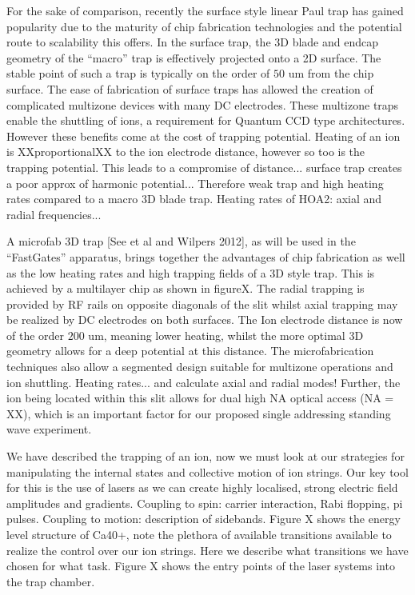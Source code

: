 For the sake of comparison, recently the surface style linear Paul
trap has gained popularity due to the maturity of chip fabrication
technologies and the potential route to scalability this offers. In
the surface trap, the 3D blade and endcap geometry of the ``macro''
trap is effectively projected onto a 2D surface. The stable point of
such a trap is typically on the order of $50$ um from the chip
surface. The ease of fabrication of surface traps has allowed the
creation of complicated multizone devices with many DC electrodes.
These multizone traps enable the shuttling of ions, a requirement for
Quantum CCD type architectures. However these benefits come at the
cost of trapping potential. Heating of an ion is XXproportionalXX to
the ion electrode distance, however so too is the trapping
potential. This leads to a compromise of distance... surface trap
creates a poor approx of harmonic potential... Therefore weak trap and
high heating rates compared to a macro 3D blade trap. Heating rates of
HOA2: axial and radial frequencies...

A microfab 3D trap [See et al and Wilpers 2012], as will be used in the ``FastGates''
apparatus, brings together the advantages of chip fabrication as well
as the low heating rates and high trapping fields of a 3D style
trap. This is achieved by a multilayer chip as shown in figureX. The
radial trapping is provided by RF rails on opposite diagonals of the
slit whilst axial trapping may be realized by DC electrodes on both
surfaces. The Ion electrode distance is now of the order $200$ um,
meaning lower heating, whilst the more optimal 3D geometry allows for
a deep potential at this distance. The microfabrication techniques
also allow a segmented design suitable for multizone operations and
ion shuttling. Heating rates... and calculate axial and radial modes!
Further, the ion being located within this slit allows for dual high
NA optical access (NA = XX), which is an important factor for our
proposed single addressing standing wave experiment.

\subtitle{Laser systems}
We have described the trapping of an ion, now we must look at our
strategies for manipulating the internal states and collective motion
of ion strings. Our key tool for this is the use of lasers as we can
create highly localised, strong electric field amplitudes and
gradients. Coupling to spin: carrier interaction, Rabi flopping, pi
pulses. Coupling to motion: description of sidebands.
Figure X shows the energy level structure of Ca40+, note the plethora
of available transitions available to realize the control over our ion
strings. Here we describe what transitions we have chosen for what
task.
Figure X shows the entry points of the laser systems into the trap
chamber.

